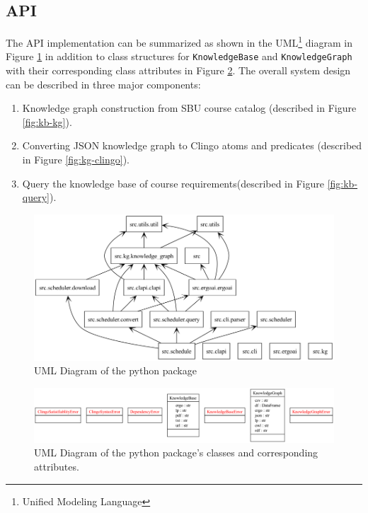 \documentclass[12pt]{article}
\begin{document}
    \subsection{API}
    \label{subsec:api}

    
    The API implementation can be summarized as shown in the UML\footnote{Unified Modeling Language} diagram in Figure \ref{fig:uml-package} in addition to class structures for {\tt{KnowledgeBase}} and {\tt{KnowledgeGraph}} with their corresponding class attributes in Figure \ref{fig:uml-classes}. The overall system design can be described in three major components: 

    \begin{enumerate}
        \item Knowledge graph construction from SBU course catalog (described in Figure \ref{fig:kb-kg}).
        \item Converting JSON knowledge graph to Clingo atoms and predicates (described in Figure \ref{fig:kg-clingo}).
        \item Query the knowledge base of course requirements(described in Figure \ref{fig:kb-query}).
    \end{enumerate}


    \begin{figure}[h!]
        \centering
        \includegraphics[scale=0.65]{figures/uml/packages_src.png}
        \caption{UML Diagram of the python package}
        \label{fig:uml-package}
    \end{figure}

    \begin{figure}[h!]
        \centering
        \includegraphics[scale=0.4]{figures/uml/classes_src.png}
        \caption{UML Diagram of the python package's classes and corresponding attributes.}
        \label{fig:uml-classes}
    \end{figure}
\end{document}
